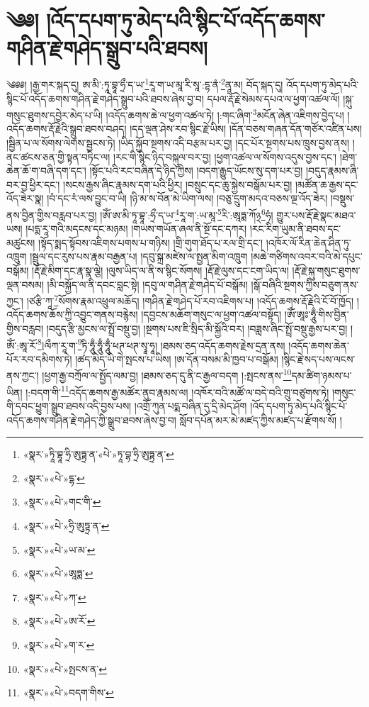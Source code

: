 \chapter{༄༅། །འོད་དཔག་ཏུ་མེད་པའི་སྙིང་པོ་འདོད་ཆགས་གཤིན་རྗེ་གཤེད་སྒྲུབ་པའི་ཐབས།}༄༅༅། །རྒྱ་གར་སྐད་དུ། ཨ་མི་:ཏཱ་བྷཱ་ཧྲྀ་ད་ཡ་\footnote{«སྣར་»ཏཱི་བྷཱ་ཧྲི་ཨུཏྟྲ་ན་«པེ་»ཏཱ་བྷ་ཧྲི་ཨུཏྟྲ་ན་}རཱ་ག་ཡ་མཱ་རི་སཱ་:དྷ་ནཾ་\footnote{«སྣར་»«པེ་»དྷ་}ནཱ་མ། བོད་སྐད་དུ། འོད་དཔག་ཏུ་མེད་པའི་སྙིང་པོ་འདོད་ཆགས་གཤིན་རྗེ་གཤེད་སྒྲུབ་པའི་ཐབས་ཞེས་བྱ་བ། དཔལ་རྡོ་རྗེ་སེམས་དཔའ་ལ་ཕྱག་འཚལ་ལོ། །སྐུ་གསུང་ཐུགས་དབྱེར་མེད་པ་ཡི། །འདོད་ཆགས་ཆེ་ལ་ཕྱག་འཚལ་ཏེ། །:གང་ཞིག་\footnote{«སྣར་»«པེ་»གང་གི་}མངོན་ཞེན་འཇིགས་བྱེད་པ། །འདོད་ཆགས་རྡོ་རྗེའི་སྒྲུབ་ཐབས་བཤད། །དད་ལྡན་ཤེས་རབ་སྙིང་རྗེ་ཡིས། །དོན་བཅས་གཞན་དོན་གཙོར་འཛིན་པས། །སྦྱིན་པ་ལ་སོགས་ལེགས་སྦྱངས་ཏེ། །ཡིད་སྐྱོབ་སྔགས་འདི་བརྩམ་པར་བྱ། །དང་པོར་སྔགས་པས་ཁྲུས་བྱས་ནས། །ནང་ཚངས་ཅན་གྱི་སྟན་བཏིང་ལ། །རང་གི་སྙིང་ཉིད་བསྐུལ་བར་བྱ། །ཕྱག་འཚལ་ལ་སོགས་འདུས་བྱས་དང་། །ཐེག་ཆེན་ཆོ་ག་བཞི་དག་དང་། །སྟོང་པའི་རང་བཞིན་དེ་ཉིད་ཀྱིས། །བདག་རྒྱུད་ཡོངས་སུ་དག་པར་བྱ། །བདུད་རྣམས་ཞི་བར་བྱ་ཕྱིར་དང་། །སངས་རྒྱས་ཞིང་རྣམས་དག་པའི་ཕྱིར། །བསྲུང་དང་ཆུ་སྐྱེས་བསྒོམ་པར་བྱ། །མཚོན་ཆ་རྒྱས་དང་འོད་ཟེར་སྣ། །བཾ་དང་རཾ་ལས་བྱུང་བ་ཡི། །ཉི་མ་ས་བོན་མེ་ཡིག་ལས། །བཅུ་དྲུག་མདའ་བཅས་ལྔ་འོད་ཟེར། །བསྡུས་ནས་བྱིན་གྱིས་བརླབ་པར་བྱ། །ཨོཾ་ཨ་མི་ཏཱ་བྷཱ་:ཧྲྀ་ད་ཡ་\footnote{«སྣར་»«པེ་»ཧྲི་ཨུཏྟྲ་ན་}རཱ་ག་:ཡ་མཱ་\footnote{«སྣར་»«པེ་»ཡ་མ་}རི་:ཨཱཏྨ་ཀོ྅\footnote{«སྣར་»«པེ་»ཨཱཏྨ་}ཧཾ། གྱུར་པས་རྡོ་རྗེ་སྣང་མཐའ་ཡས། །པདྨ་རཱ་གའི་མདངས་དང་མཉམ། །གཡས་གཡོན་ཞལ་ནི་སྔོ་དང་དཀར། །རང་རིག་ཡུམ་ནི་ཐབས་དང་མཚུངས། །སྟོད་སྨད་སྟོབས་འཇིགས་པགས་པ་གཉིས། །གྲི་གུག་ཐོད་པ་རལ་གྲི་དང་། །འཁོར་ལོ་རིན་ཆེན་ཤིན་ཏུ་འཁྲུག །སྦྲུལ་དང་རུས་པས་རྣམ་བརྒྱན་པ། །དབུ་སྐྲ་མཛེས་ལ་སྤྱན་མིག་འཁྲུག །མཆེ་གཙིགས་འབར་བའི་མེ་དཔུང་བསྒོམ། །རྡོ་རྗེ་མིག་དང་རྣ་སྣ་ལྕེ། །ལུས་ཡིད་ལ་ནི་ས་སྙིང་སོགས། །རྡོ་རྗེ་ལུས་དང་ངག་ཡིད་ལ། །རྡོ་རྗེ་སྐུ་གསུང་ཐུགས་ལྡན་བསམ། །མི་བསྐྱོད་ལ་ནི་དབང་བླང་སྟེ། །དབུ་ལ་གཤིན་རྗེ་གཤེད་པོ་བསྒོམ། །སྒོ་བཞིའི་སྔགས་ཀྱིས་བཅུག་ནས་ཀྱང་། །ཙརྩི་ཀཱ་\footnote{«སྣར་»«པེ་»ཀ་}སོགས་རྣམ་འཕྲུལ་མཆོད། །གཤིན་རྗེ་གཤེད་པོ་རབ་འཇིགས་པ། །འདོད་ཆགས་རྡོ་རྗེའི་ངོ་བོ་ཁྱོད། །འདོད་ཆགས་ཆོས་ཀྱི་འབྱུང་གནས་བརྙེས། །དབྱངས་མཆོག་གསུང་ལ་ཕྱག་འཚལ་བསྟོད། །ཨོཾ་ཨཱཿ་ཧཱུྃ་གིས་བྱིན་གྱིས་བརླབ། །བདུད་རྩི་མྱངས་ལ་སྤྲོ་བསྡུ་བྱ། །སྔགས་པས་ཇི་སྲིད་མི་སྐྱོའི་བར། །བཟླས་ཞིང་སྤྲོ་བསྡུ་རྒྱས་པར་བྱ། །
ཨོཾ་:ཨཱ་རོ་\footnote{«སྣར་»«པེ་»ཨ་རོ་}lལྀཀ་རཱ་ག་\footnote{«སྣར་»«པེ་»ག་ར་}ཏི་ཧཱུྃ་ཧཱུྃ་ཧཱུྃ་ཕཊ་ཕཊ་སྭཱ་ཧཱ། །ཐམས་ཅད་འདོད་ཆགས་རྗེས་དྲན་ནས། །འདོད་ཆགས་ཆེན་པོར་རབ་དམིགས་ཏེ། །ཚད་མེད་ཡི་གེ་སྤངས་པ་ཡིས། །ཨ་དོན་བསམ་མི་ཁྱབ་པ་བསྒོམ། །སྙིང་རྗེ་སད་པས་ལངས་ནས་ཀྱང་། །ཕྱག་རྒྱ་བཀྲོལ་ལ་སྤྱོད་ལམ་བྱ། །ཐམས་ཅད་དུ་ནི་ང་རྒྱལ་བདག །:སྤངས་ནས་\footnote{«སྣར་»«པེ་»སྤངས་ན་}དམ་ཚིག་ཉམས་པ་ཡིན། །:བདག་གི་\footnote{«སྣར་»«པེ་»བདག་གིས་}འདོད་ཆགས་རྒྱ་མཚོར་ནུབ་རྣམས་ལ། །འཁོར་བའི་མཚོ་ལ་བདེ་བའི་གྲུ་བཙུགས་ཏེ། །གསུང་གི་དབང་ཕྱུག་སྒྲུབ་ཐབས་འདི་བྱས་པས། །འགྲོ་ཀུན་པདྨ་བཞིན་དུ་དྲི་མེད་ཤོག །འོད་དཔག་ཏུ་མེད་པའི་སྙིང་པོ་འདོད་ཆགས་གཤིན་རྗེ་གཤེད་ཀྱི་སྒྲུབ་ཐབས་ཞེས་བྱ་བ། སློབ་དཔོན་མར་མེ་མཛད་ཀྱིས་མཛད་པ་རྫོགས་སོ། ། 